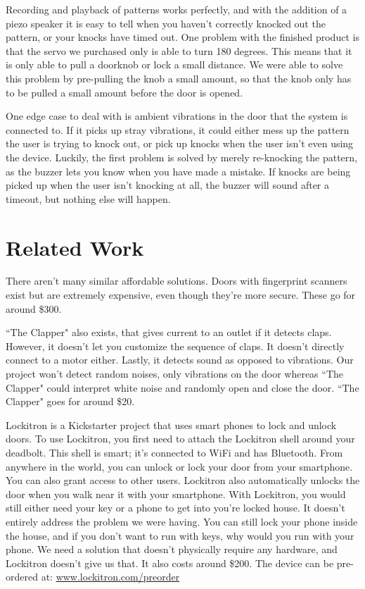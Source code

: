 \documentclass[11pt]{article}			%
\begin{document}
Recording and playback of patterns works perfectly, and with the addition of a piezo speaker it is easy to tell when you haven't correctly knocked out the pattern, or your knocks have timed out.  One problem with the finished product is that the servo we purchased only is able to turn 180 degrees.  This means that it is only able to pull a doorknob or lock a small distance.  We were able to solve this problem by pre-pulling the knob a small amount, so that the knob only has to be pulled a small amount before the door is opened.

One edge case to deal with is ambient vibrations in the door that the system is connected to.  If it picks up stray vibrations, it could either mess up the pattern the user is trying to knock out, or pick up knocks when the user isn't even using the device.  Luckily, the first problem is solved by merely re-knocking the pattern, as the buzzer lets you know when you have made a mistake.  If knocks are being picked up when the user isn't knocking at all, the buzzer will sound after a timeout, but nothing else will happen.

\section{Related Work}
There aren't many similar affordable solutions. Doors with fingerprint scanners exist but are extremely expensive, even though they're more secure. These go for around \$300.

``The Clapper" also exists, that gives current to an outlet if it detects claps. However, it doesn't let you customize the sequence of claps. It doesn't directly connect to a motor either. Lastly, it detects sound as opposed to vibrations. Our project won't detect random noises, only vibrations on the door whereas ``The Clapper" could interpret white noise and randomly open and close the door. ``The Clapper" goes for around \$20. 

Lockitron is a Kickstarter project that uses smart phones to lock and unlock doors. To use Lockitron, you first need to attach the Lockitron shell around your deadbolt. This shell is smart; it's connected to WiFi and has Bluetooth. From anywhere in the world, you can unlock or lock your door from your smartphone. You can also grant access to other users. Lockitron also automatically unlocks the door when you walk near it with your smartphone. With Lockitron, you would still either need your key or a phone to get into you're locked house. It doesn't entirely address the problem we were having. You can still lock your phone inside the house, and if you don't want to run with keys, why would you run with your phone. We need a solution that doesn't physically require any hardware, and Lockitron doesn't give us that. It also costs around \$200. The device can be pre-ordered at: \url{www.lockitron.com/preorder}
\end{document}
